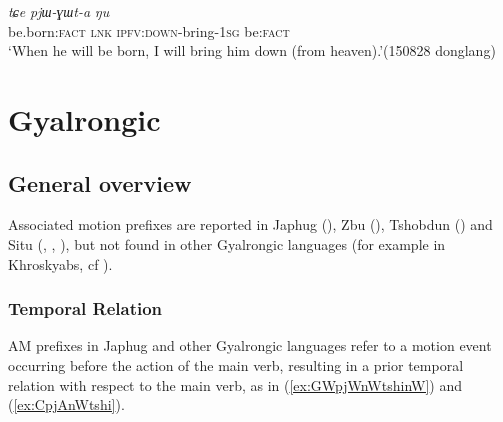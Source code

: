\documentclass[oneside,a4paper,11pt]{article}
\newcommand{\ipa}[1]{{\phon\textit{#1}}}
\begin{document}
\begin{exe}
\ex \label{ex:pjWGWta}
 \gll \ipa{sci} 	\ipa{tɕe} 	\ipa{pjɯ-ɣɯt-a} 	\ipa{ŋu}  \\
 be.born:\textsc{fact}  \textsc{lnk} \textsc{ipfv}:\textsc{down}-bring-\textsc{1sg} be:\textsc{fact} \\
\glt `When he will be born, I will bring him down (from heaven).'(150828 donglang)
\end{exe}
 
  
\section{Gyalrongic}

\subsection{General overview}
Associated motion prefixes are reported in Japhug (\citealt{jacques13harmonization}), Zbu (\citealt{gong18these}), Tshobdun (\citealt{jackson14morpho}) and Situ (\citealt[200-204]{zhang16bragdbar}, \citealt[497-500]{prins16kyomkyo}, \citealt{linyj17space}), but not found in other Gyalrongic languages (for example in Khroskyabs, cf \citealt{lai17khroskyabs}).
 
%
%

 \subsubsection{Temporal Relation}
AM prefixes in Japhug and other Gyalrongic languages refer to a motion event occurring before the action of the main verb, resulting in a prior temporal relation with respect to the main verb, as in  (\ref{ex:GWpjWnWtshinW}) and (\ref{ex:CpjAnWtshi}).
\end{document}
